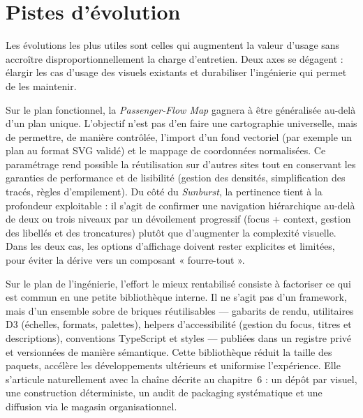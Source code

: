 
\section{Pistes d’évolution}
\label{sec:chap8-pistes-evolution}

Les évolutions les plus utiles sont celles qui augmentent la valeur d’usage sans accroître disproportionnellement la charge d’entretien. Deux axes se dégagent : élargir les cas d’usage des visuels existants et durabiliser l’ingénierie qui permet de les maintenir.

Sur le plan fonctionnel, la \textit{Passenger-Flow Map} gagnera à être généralisée au-delà d’un plan unique. L’objectif n’est pas d’en faire une cartographie universelle, mais de permettre, de manière contrôlée, l’import d’un fond vectoriel (par exemple un plan au format SVG validé) et le mappage de coordonnées normalisées. Ce paramétrage rend possible la réutilisation sur d’autres sites tout en conservant les garanties de performance et de lisibilité (gestion des densités, simplification des tracés, règles d’empilement). Du côté du \textit{Sunburst}, la pertinence tient à la profondeur exploitable : il s’agit de confirmer une navigation hiérarchique au-delà de deux ou trois niveaux par un dévoilement progressif (focus + context, gestion des libellés et des troncatures) plutôt que d’augmenter la complexité visuelle. Dans les deux cas, les options d’affichage doivent rester explicites et limitées, pour éviter la dérive vers un composant « fourre-tout ».

Sur le plan de l’ingénierie, l’effort le mieux rentabilisé consiste à factoriser ce qui est commun en une petite bibliothèque interne. Il ne s’agit pas d’un framework, mais d’un ensemble sobre de briques réutilisables — gabarits de rendu, utilitaires D3 (échelles, formats, palettes), helpers d’accessibilité (gestion du focus, titres et descriptions), conventions TypeScript et styles — publiées dans un registre privé et versionnées de manière sémantique. Cette bibliothèque réduit la taille des paquets, accélère les développements ultérieurs et uniformise l’expérience. Elle s’articule naturellement avec la chaîne décrite au chapitre~6 : un dépôt par visuel, une construction déterministe, un audit de packaging systématique et une diffusion via le magasin organisationnel.

